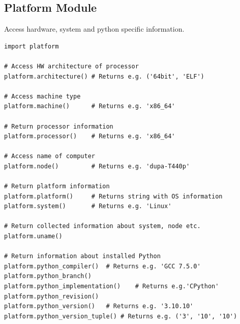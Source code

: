 \documentclass{article}
\begin{document}
\subsection{Platform Module}
Access hardware, system and python specific information.
\begin{lstlisting}[style=pystyle] 
import platform

# Access HW architecture of processor
platform.architecture()	# Returns e.g. ('64bit', 'ELF')

# Access machine type
platform.machine()		# Returns e.g. 'x86_64'

# Return processor information
platform.processor()	# Returns e.g. 'x86_64'

# Access name of computer
platform.node()			# Returns e.g. 'dupa-T440p'

# Return platform information
platform.platform()		# Returns string with OS information
platform.system()		# Returns e.g. 'Linux'

# Return collected information about system, node etc.
platform.uname()

# Return information about installed Python
platform.python_compiler()	# Returns e.g. 'GCC 7.5.0'
platform.python_branch()
platform.python_implementation()	# Returns e.g.'CPython'
platform.python_revision()
platform.python_version()	# Returns e.g. '3.10.10'
platform.python_version_tuple() # Returns e.g. ('3', '10', '10')
\end{lstlisting}
\end{document}

